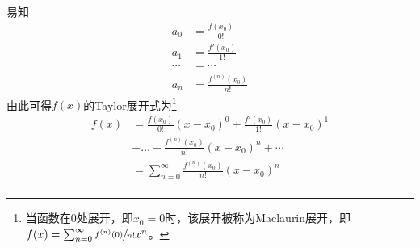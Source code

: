 易知
\begin{align*}
  a_0 &= \frac{f(x_0)}{0!} \\
  a_1 &= \frac{f'(x_0)}{1!} \\
  \cdots &= \cdots \\
  a_n &= \frac{f^{(n)}(x_0)}{n!}
\end{align*}
由此可得$f(x)$的Taylor展开式为\footnote{当函数在$0$处展开，即$x_0 = 0$时，该展开被称为Maclaurin展开，即$f(x) = \sum_{n = 0}^\infty \sfrac{f^{(n)}(0)}{n!}x^n$。}
\begin{align*}
  f(x) &= \frac{f(x_0)}{0!}(x - x_0)^0 + \frac{f'(x_0)}{1!}(x - x_0)^1 \\
  &+ \dots + \frac{f^{(n)}(x_0)}{n!}(x - x_0)^n + \cdots \\
  &= \sum_{n = 0}^\infty \frac{f^{(n)}(x_0)}{n!}(x - x_0)^n \\
\end{align*}
